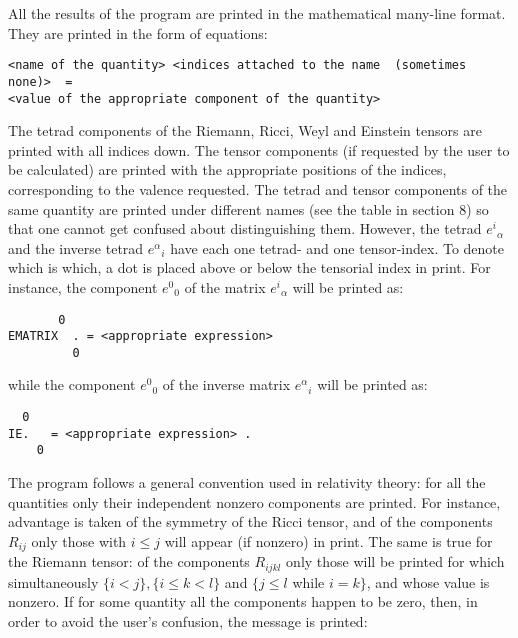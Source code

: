 All the results of the program are printed in  the  mathematical many-line
format. They are printed in the form of
     equations:

\bigskip

\begin{verbatim}
<name of the quantity> <indices attached to the name  (sometimes  none)>  =
<value of the appropriate component of the quantity>
\end{verbatim}

\bigskip

The tetrad components of the Riemann, Ricci,  Weyl  and Einstein tensors are
printed with all indices down. The tensor components (if requested by the user
to  be  calculated)
     are  printed  with the appropriate positions of the indices,
corresponding to the valence requested. The tetrad and  tensor  components  of
the same quantity are printed under different names (see the table in section
8) so that one cannot
     get confused about distinguishing them. However, the  tetrad
${e^i}_{\alpha}$ and the inverse tetrad ${e^{\alpha}}_i$   have each one
tetrad- and one tensor-index. To denote which is  which,  a  dot  is  placed
     above or below the tensorial index in print.  For  instance,
the component ${e^0}_0$ of the matrix ${e^i}_{\alpha}$ will be printed as:

\begin{verbatim}
       0
EMATRIX  . = <appropriate expression>
         0
\end{verbatim}

\noindent while the component ${e^0}_0$ of the inverse matrix ${e^{\alpha}}_i$
will be printed as:

\begin{verbatim}
  0
IE.   = <appropriate expression> .
    0
\end{verbatim}

The program follows a general convention used in  relativity theory: for all
the quantities only their independent nonzero components are printed. For
instance,  advantage  is taken  of  the symmetry of the Ricci tensor, and of
the components $R_{ij}$ only those with $i \leq j$ will appear  (if nonzero) in
print. The same is true for the Riemann  tensor: of the components $R_{ijkl}$
only those will be printed for which simultaneously $\{i < j\}, \{i \leq k <
l\}$ and $\{j \leq l$ while $i = k\}$, and whose value is nonzero. If for some
quantity all the components happen to be zero, then, in
     order to avoid the user's confusion, the message is printed:

